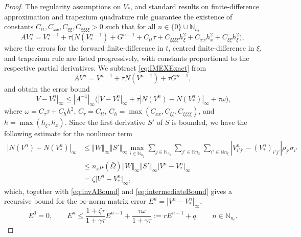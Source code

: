 \documentclass[a4paper,final]{siamart190516}
\newcommand{\Nb}{\mathbb{N}}
\newcommand{\ep}{\varepsilon}
\begin{document}
\begin{proof}
  The regularity assumptions on $V_*$, and standard results on finite-difference
  approximation and trapezium quadrature rule guarantee the existence of constants
  $C_{tt},C_{xx},C_{\xi\xi},C_{\xi\xi\xi\xi} > 0$ such that for all $n \in \{0 \}
  \cup \Nb_{n_t}$
  \begin{equation}\label{eq:IMEXExact}
    AV_*^n = V_*^{n-1} + \tau \big( N(V_*^{n-1}) + G^{n-1} +  
	C_{tt} \tau + C_{\xi\xi\xi\xi}h^2_\xi + C_{xx}h_x^2 + C_{\xi\xi}h_\xi^2
    \big),
  \end{equation}
  where the errors for the forward finite-difference in $t$, centred finite-difference
  in $\xi$, and trapezium rule are listed progressively, with constants proportional
  to the respective partial derivatives. We subtract \eqref{eq:IMEXExact} from
  \[
    AV^n = V^{n-1} + \tau N(V^{n-1}) + \tau G^{n-1}, %
  \]
  and obtain the error bound
  \begin{equation}\label{eq:intermediateBound}
    |V - V_*^n|_\infty \leq |A^{-1}|_\infty \big(|V - V_*^n|_\infty + \tau |N(V^n) -
    N(V_*^n)|_\infty + \tau \omega \big),
  \end{equation}
  where $\omega = C_\tau \tau + C_h h^2$, $C_\tau = C_{tt}$, $C_h =
  \max(C_{xx},C_{\xi\xi},C_{\xi\xi\xi\xi})$, and
  $h = \max(h_\xi,h_x)$. 
  Since the first derivative $S'$ of $S$ is bounded, we have the following estimate
  for the nonlinear term
  \[
    \begin{aligned}
    |N(V^{n}) - N(V_*^n)|_\infty  
    & \leq
    \Vert W \Vert_\infty
    \Vert S' \Vert_\infty
    \max_{i \in \Nb_{n_\xi}} \sum_{j \in \Nb_{n_x}} 
	       \sum_{j' \in \Nb{n_x}} \sum_{i' \in \Nb{n_\xi}}
	       |V^n_{i'j'}-(V_*^n)_{i'j'}|\rho_{j'}\sigma_{i'} \\
    & \leq
    n_x \mu(\bar \Omega)
    \Vert W \Vert_\infty
    \Vert S' \Vert_\infty
    \vert V^n - V_*^n \vert_\infty \\
    &
    = \zeta \vert V^n - V_*^n \vert_\infty ,
    \end{aligned}
  \]
  which, together with \eqref{eq:invABound} and \eqref{eq:intermediateBound} gives a
  recursive bound for the $\infty$-norm matrix error $E^n = |V^n-V_*^n|_\infty$,
  \[
    E^0 = 0, \qquad
    E^n \leq \frac{1+\zeta \tau}{1+\gamma \tau}E^{n-1} + \frac{\tau \omega}{1 + \gamma
    \tau} := r E^{n-1} + q.
    \qquad n \in \Nb_{n_t}.
\]
\end{proof}
\end{document}
